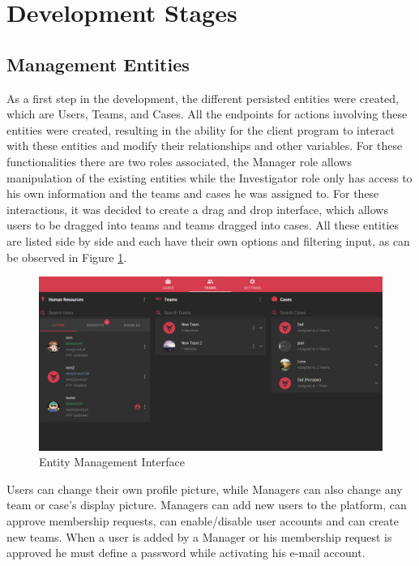 \section{Development Stages}

\subsection{Management Entities}

As a first step in the development, the different persisted entities were created, which are Users, Teams, and Cases. All the endpoints for actions involving these 
entities were created, resulting in the ability for the client program to interact with these entities and modify their relationships and other variables.
For these functionalities there are two roles associated, the Manager role allows manipulation of the existing entities while the Investigator role only has access to his
own information and the teams and cases he was assigned to. For these interactions, it was decided to create a drag and drop interface, which allows users to be dragged into
teams and teams dragged into cases. All these entities are listed side by side and each have their own options and filtering input, as can be observed in Figure \ref{fig:users}.

\begin{figure}[ht]
 \centering
 \includegraphics[width=1\linewidth]{imgs/users.png}
 \caption{Entity Management Interface}
 \label{fig:users}
\end{figure}

Users can change their own profile picture, while Managers can also change any team or case's display picture.
Managers can add new users to the platform, can approve membership requests, can enable/disable user accounts and can create new teams.
When a user is added by a Manager or his membership request is approved he must define a password while activating his e-mail account.



